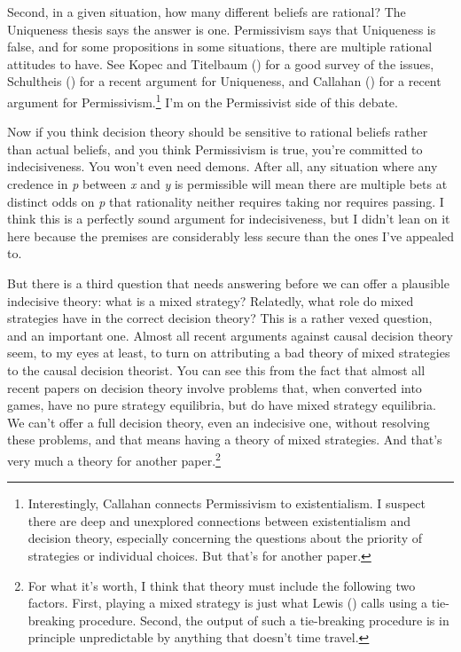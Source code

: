\documentclass[
  10pt,
  letterpaper,
  DIV=11,
  numbers=noendperiod,
  twoside]{scrartcl}
\begin{document}
Second, in a given situation, how many different beliefs are rational?
The Uniqueness thesis says the answer is one. Permissivism says that
Uniqueness is false, and for some propositions in some situations, there
are multiple rational attitudes to have. See Kopec and Titelbaum
() for a good survey of the
issues, Schultheis () for a recent
argument for Uniqueness, and Callahan
() for a recent argument for
Permissivism.\footnote{Interestingly, Callahan connects Permissivism to
  existentialism. I suspect there are deep and unexplored connections
  between existentialism and decision theory, especially concerning the
  questions about the priority of strategies or individual choices. But
  that's for another paper.} I'm on the Permissivist side of this
debate.

Now if you think decision theory should be sensitive to rational beliefs
rather than actual beliefs, and you think Permissivism is true, you're
committed to indecisiveness. You won't even need demons. After all, any
situation where any credence in \emph{p} between \emph{x} and \emph{y}
is permissible will mean there are multiple bets at distinct odds on
\emph{p} that rationality neither requires taking nor requires passing.
I think this is a perfectly sound argument for indecisiveness, but I
didn't lean on it here because the premises are considerably less secure
than the ones I've appealed to.

But there is a third question that needs answering before we can offer a
plausible indecisive theory: what is a mixed strategy? Relatedly, what
role do mixed strategies have in the correct decision theory? This is a
rather vexed question, and an important one. Almost all recent arguments
against causal decision theory seem, to my eyes at least, to turn on
attributing a bad theory of mixed strategies to the causal decision
theorist. You can see this from the fact that almost all recent papers
on decision theory involve problems that, when converted into games,
have no pure strategy equilibria, but do have mixed strategy equilibria.
We can't offer a full decision theory, even an indecisive one, without
resolving these problems, and that means having a theory of mixed
strategies. And that's very much a theory for another paper.\footnote{For
  what it's worth, I think that theory must include the following two
  factors. First, playing a mixed strategy is just what Lewis
  () calls using a
  tie-breaking procedure. Second, the output of such a tie-breaking
  procedure is in principle unpredictable by anything that doesn't time
  travel.}
\end{document}
